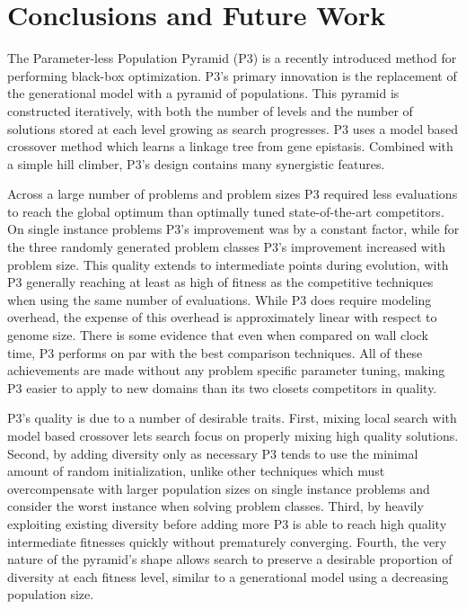 \chapter{Conclusions and Future Work}
The Parameter-less Population Pyramid (P3) is a recently introduced method for performing black-box
optimization. P3's primary innovation is the replacement of the generational model with a pyramid of populations.
This pyramid is constructed iteratively, with both the number of levels and the number of solutions stored
at each level growing as search progresses. P3 uses a model based crossover method
which learns a linkage tree from gene epistasis. Combined with a simple hill climber, P3's design contains
many synergistic features.

Across a large number of problems and problem sizes P3 required less evaluations to reach the global optimum
than optimally tuned state-of-the-art competitors. On single instance problems P3's improvement was by a
constant factor, while for the three randomly generated problem classes P3's improvement increased with problem size. This
quality extends to intermediate points during evolution, with P3 generally reaching at least as high
of fitness as the competitive techniques when using the same number of evaluations. While P3 does require
modeling overhead, the expense of this overhead is approximately linear with respect to genome size. There
is some evidence that even when compared on wall clock time, P3 performs on par with
the best comparison techniques. All of these achievements are made without any problem specific parameter
tuning, making P3 easier to apply to new domains than its two closets competitors in quality.

P3's quality is due to a number of desirable traits. First, mixing local search with model based
crossover lets search focus on properly mixing high quality solutions. Second, by adding diversity only
as necessary P3 tends to use the minimal amount of random initialization, unlike other techniques which must
overcompensate with larger population sizes on single instance problems and consider the worst instance
when solving problem classes. Third, by heavily exploiting existing diversity before adding more P3 is able
to reach high quality intermediate fitnesses quickly without prematurely converging. Fourth, the very
nature of the pyramid's shape allows search to preserve a desirable proportion of diversity at
each fitness level, similar to a generational model using a decreasing population size.

